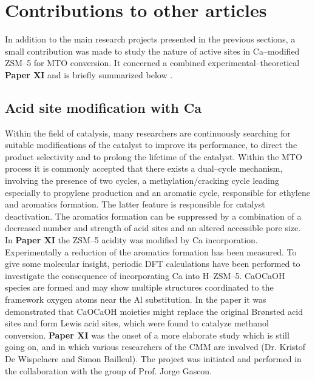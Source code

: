\section{Contributions to other articles}
In addition to the main research projects presented in the previous sections, a
small contribution was made to study the nature of active sites in Ca--modified
ZSM--5 for MTO conversion. It concerned a combined
experimental--theoretical \textbf{Paper XI} and is briefly summarized
below \cite{Yarulina2016}.


\subsection*{Acid site modification with Ca}
Within the field of catalysis, many researchers are continuously searching for
suitable modifications of the catalyst to improve its performance, to direct the
product selectivity and to prolong the lifetime of the catalyst. Within the MTO
process it is commonly accepted that there exists a dual--cycle mechanism,
involving the presence of two cycles, a methylation/cracking cycle leading
especially to propylene production and an aromatic cycle, responsible for
ethylene and aromatics formation. The latter feature is responsible for catalyst
deactivation. The aromatics formation can be suppressed by a combination of a
decreased number and strength of acid sites and an altered accessible pore size. 
In \textbf{Paper XI} the ZSM--5 acidity was modified by Ca incorporation.
Experimentally a reduction of the aromatics formation has been measured. To give
some molecular insight, periodic DFT calculations have been performed to
investigate the consequence of incorporating Ca into H--ZSM--5. CaOCaOH\ce{^+}
species are formed and may show multiple structures coordinated to the framework
oxygen atoms near the Al substitution. In the
paper it was demonstrated that CaOCaOH\ce{^+} moieties might replace the
original Br\o{}nsted acid sites and form Lewis acid sites, which were found to catalyze methanol
conversion. \textbf{Paper XI} was the onset of a more elaborate study which is
still going on, and in which various researchers of the CMM are involved (Dr.
Kristof De Wispelaere and Simon Bailleul). The project was initiated and
performed in the collaboration with the group of Prof. Jorge Gascon.


\clearpage{\pagestyle{empty}\cleardoublepage}